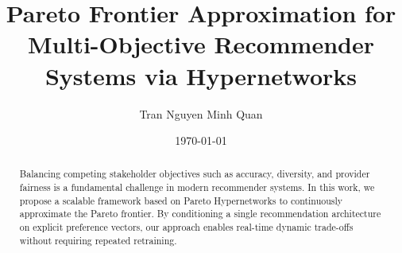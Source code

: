 \documentclass[11pt,a4paper]{article}
\title{Pareto Frontier Approximation for Multi-Objective Recommender Systems via Hypernetworks}
\author{Tran Nguyen Minh Quan}
\date{\today}
\begin{document}
\maketitle

\begin{abstract}
Balancing competing stakeholder objectives such as accuracy, diversity, and provider fairness is a fundamental challenge in modern recommender systems. In this work, we propose a scalable framework based on Pareto Hypernetworks to continuously approximate the Pareto frontier. By conditioning a single recommendation architecture on explicit preference vectors, our approach enables real-time dynamic trade-offs without requiring repeated retraining.
\end{abstract}






\end{document}

